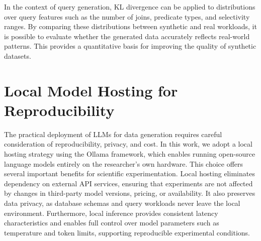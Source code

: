 In the context of query generation, KL divergence can be applied to distributions over query features such as the number of joins, predicate types, and selectivity ranges. By comparing these distributions between synthetic and real workloads, it is possible to evaluate whether the generated data accurately reflects real-world patterns. This provides a quantitative basis for improving the quality of synthetic datasets.

\section{Local Model Hosting for Reproducibility}

The practical deployment of LLMs for data generation requires careful consideration of reproducibility, privacy, and cost. In this work, we adopt a local hosting strategy using the Ollama framework, which enables running open-source language models entirely on the researcher's own hardware. This choice offers several important benefits for scientific experimentation. Local hosting eliminates dependency on external API services, ensuring that experiments are not affected by changes in third-party model versions, pricing, or availability. It also preserves data privacy, as database schemas and query workloads never leave the local environment. Furthermore, local inference provides consistent latency characteristics and enables full control over model parameters such as temperature and token limits, supporting reproducible experimental conditions.
